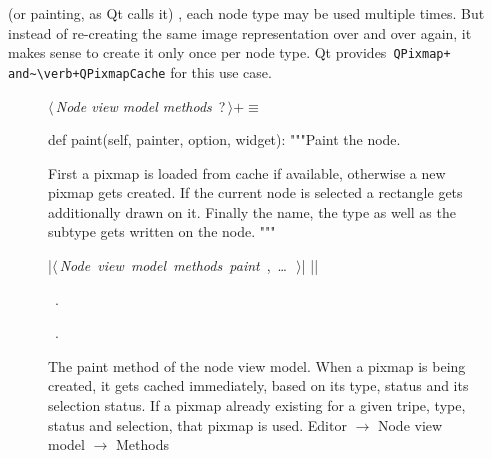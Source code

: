 \documentclass[%
    a4paper,    %
    justified,  %
    nobib,      %
    openany     %
]{tufte-book}
\begin{document}
 (or painting, as Qt calls it) ,
each node type may be used multiple times. But instead of re-creating the same
image representation over and over again, it makes sense to create it only once
per node type. Qt provides~\verb=QPixmap+ and~\verb+QPixmapCache= for this use
case.

\begin{figure}
\begin{flushleft} \small
\begin{minipage}{\linewidth}\label{scrap73}\raggedright\small
{} $\langle\,${\itshape Node view model methods}\nobreak\ {\footnotesize {?}}$\,\rangle+\equiv$
\vspace{-1ex}
\begin{pythoncode}
def paint(self, painter, option, widget):
    """Paint the node.

    First a pixmap is loaded from cache if available, otherwise
    a new pixmap gets created. If the current node is selected a
    rectangle gets additionally drawn on it. Finally the name, the type
    as well as the subtype gets written on the node.
    """

    |\hbox{$\langle\,${\itshape Node view model methods paint}\nobreak\ {\footnotesize {}, \ldots\ }$\,\rangle$}|
|\NWsep|
\end{pythoncode}
\vspace{1.5ex}
\footnotesize
\begin{list}{}{\setlength{\itemsep}{-\parsep}\setlength{\itemindent}{-\leftmargin}}
\item \NWtxtMacroDefBy\ .
\item \NWtxtMacroRefIn\ .

\item{}
\end{list}
\end{minipage}\vspace{4ex}
\end{flushleft}
\caption{The paint method of the node view model. When a pixmap is being
  created, it gets cached immediately, based on its type, status and its
  selection status. If a pixmap already existing for a given tripe, type, status
  and selection, that pixmap is used.
  \newline{}\newline{}Editor $\rightarrow$ Node view model $\rightarrow$
  Methods}
\label{editor:lst:node-view-model:methods:paint}
\end{figure}
\end{document}
